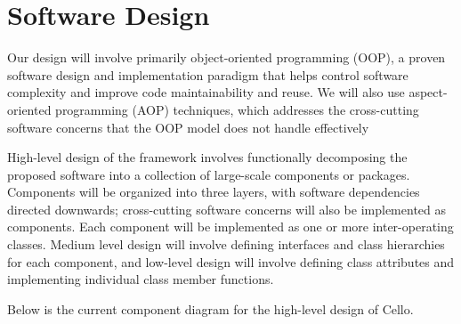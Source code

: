\documentclass[11pt,letterpaper]{article}
\newcommand{\cello}{\textsf{Cello}}
\begin{document}
\section{Software Design} \label{s:design}


Our design will involve primarily object-oriented programming (OOP), a
proven software design and implementation paradigm that helps control
software complexity and improve code maintainability and reuse.  We
will also use aspect-oriented programming (AOP) techniques, which
addresses the cross-cutting software concerns that the OOP model does
not handle effectively

High-level design of the framework involves functionally decomposing
the proposed software into a collection of large-scale components or
packages.  Components will be organized into three layers, with
software dependencies directed downwards; cross-cutting software
concerns will also be implemented as components.  Each component will
be implemented as one or more inter-operating classes.  Medium level
design will involve defining interfaces and class hierarchies for each
component, and low-level design will involve defining class attributes
and implementing individual class member functions.

Below is the current component diagram for the high-level design of
\cello.

\end{document}
